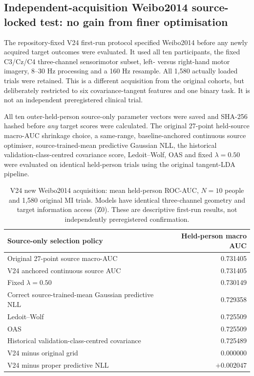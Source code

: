 \subsection{Independent-acquisition Weibo2014 source-locked test: no gain from finer optimisation}
\label{sec:v24-weibo}
The repository-fixed V24 first-run protocol specified Weibo2014
\cite{yi2014simplecompound,jayaram2018moabb} before any newly acquired
target outcomes were evaluated. It used all ten participants, the
fixed C3/Cz/C4 three-channel sensorimotor subset, left- versus
right-hand motor imagery, 8--30 Hz processing and a 160 Hz resample.
All 1,580 actually loaded trials were retained. This is a
different acquisition from the original cohorts, but deliberately
restricted to six covariance-tangent features and one binary task.
It is not an independent preregistered clinical trial.

All ten outer-held-person source-only parameter vectors were saved
and SHA-256 hashed before \emph{any} target scores were calculated.
The original 27-point held-source macro-AUC shrinkage choice,
a same-range, baseline-anchored continuous source optimiser,
source-trained-mean predictive Gaussian NLL, the historical
validation-class-centred covariance score, Ledoit--Wolf, OAS
and fixed $\lambda=0.50$ were evaluated on identical held-person
trials using the original tangent-LDA pipeline.

\begin{table}[tb]
\centering\small
\caption{V24 new Weibo2014 acquisition: mean held-person ROC-AUC,
$N=10$ people and 1,580 original MI trials. Models have identical
three-channel geometry and target information access (Z0).
These are descriptive first-run results, not independently
preregistered confirmation.}
\label{tab:v24-weibo}
\begin{tabular}{lr}
\toprule
Source-only selection policy & Held-person macro AUC\\
\midrule
Original 27-point source macro-AUC & 0.731405\\
V24 anchored continuous source AUC & 0.731405\\
Fixed $\lambda=0.50$ & 0.730149\\
Correct source-trained-mean Gaussian predictive NLL & 0.729358\\
Ledoit--Wolf & 0.725509\\
OAS & 0.725509\\
Historical validation-class-centred covariance & 0.725489\\
\midrule
V24 minus original grid & $0.000000$\\
V24 minus proper predictive NLL & $+0.002047$\\
\bottomrule
\end{tabular}
\end{table}

